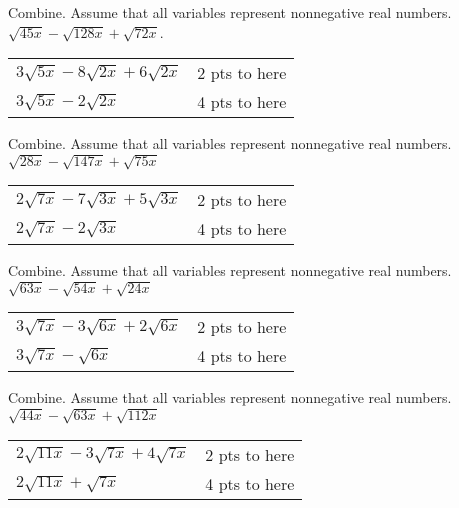 {
	Combine. Assume that all variables represent nonnegative real numbers. $\displaystyle \sqrt{45x}-\sqrt{128x}+\sqrt{72x}$.
}
{
	\begin{tabular}{l r}
	$3\sqrt{5x}-8\sqrt{2x}+6\sqrt{2x}$ & 2 pts to here\\
	$3\sqrt{5x}-2\sqrt{2x}$ & 4 pts to here
	\end{tabular}
}

{
	Combine. Assume that all variables represent nonnegative real numbers. $\displaystyle \sqrt{28x}-\sqrt{147x}+\sqrt{75x}$
}
{
	\begin{tabular}{l r}
	$2\sqrt{7x}-7\sqrt{3x}+5\sqrt{3x}$ & 2 pts to here\\
	$2\sqrt{7x}-2\sqrt{3x}$ & 4 pts to here
	\end{tabular}
}

{
	Combine. Assume that all variables represent nonnegative real numbers. $\displaystyle \sqrt{63x}-\sqrt{54x}+\sqrt{24x}$
}
{
	\begin{tabular}{l r}
	$3\sqrt{7x}-3\sqrt{6x}+2\sqrt{6x}$ & 2 pts to here\\
	$3\sqrt{7x}-\sqrt{6x}$ & 4 pts to here
	\end{tabular}
}

{
	Combine. Assume that all variables represent nonnegative real numbers. $\displaystyle \sqrt{44x}-\sqrt{63x}+\sqrt{112x}$
}
{
	\begin{tabular}{l r}
	$2\sqrt{11x}-3\sqrt{7x}+4\sqrt{7x}$ & 2 pts to here\\
	$2\sqrt{11x}+\sqrt{7x}$ & 4 pts to here
	\end{tabular}
}
